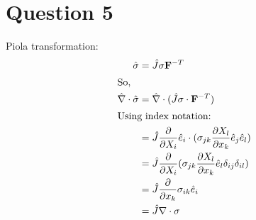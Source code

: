 \documentclass[a4paper,12pt]{article} %
\begin{document}
\section{\textbf{Question 5}}
Piola transformation: 
\begin{align*}
\hat {\mathbf{\sigma}} &= \hat J \mathbf{\sigma} {\mathbf{F}}^{-T}\\
\intertext{So,}
\hat {\nabla} \cdot \hat {\mathbf{\sigma}} &= \hat \nabla \cdot (\hat J \mathbf{\sigma} \cdot {\mathbf{F}}^{-T})\\
\intertext{Using index notation:}
&= \hat J \frac{\partial}{\partial X_i} \hat e_i \cdot (\sigma_{jk} \frac{\partial X_l}{\partial x_k} \hat e_j \hat e_l)\\
&= \hat J \frac{\partial}{\partial X_i} (\sigma_{jk} \frac{\partial X_l}{\partial x_k} \hat e_l \delta_{ij} \delta_{il})\\
&= \hat J \frac{\partial}{\partial x_k} \sigma_{ik} \hat e_i\\
&= \hat J \nabla \cdot \sigma
\end{align*}
\end{document}
